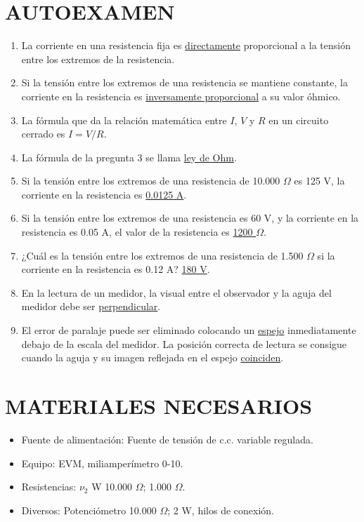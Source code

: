 \documentclass[12pt]{article}
\begin{document}
\section{AUTOEXAMEN}
\begin{enumerate}
    \item La corriente en una resistencia fija es \underline{directamente} proporcional a la tensión entre los extremos de la resistencia.
    \item Si la tensión entre los extremos de una resistencia se mantiene constante, la corriente en la resistencia es \underline{inversamente proporcional} a su valor óhmico.
    \item La fórmula que da la relación matemática entre \( I \), \( V \) y \( R \) en un circuito cerrado es \underline{\( I = V/R \)}.
    \item La fórmula de la pregunta 3 se llama \underline{ley de Ohm}.
    \item Si la tensión entre los extremos de una resistencia de 10.000 \( \Omega \) es 125 V, la corriente en la resistencia es \underline{0.0125 A}.
    \item Si la tensión entre los extremos de una resistencia es 60 V, y la corriente en la resistencia es 0.05 A, el valor de la resistencia es \underline{1200 \( \Omega \)}.
    \item ¿Cuál es la tensión entre los extremos de una resistencia de 1.500 \( \Omega \) si la corriente en la resistencia es 0.12 A? \underline{180 V}.
    \item En la lectura de un medidor, la visual entre el observador y la aguja del medidor debe ser \underline{perpendicular}.
    \item El error de paralaje puede ser eliminado colocando un \underline{espejo} inmediatamente debajo de la escala del medidor. La posición correcta de lectura se consigue cuando la aguja y su imagen reflejada en el espejo \underline{coinciden}.
\end{enumerate}

\section{MATERIALES NECESARIOS}
\begin{itemize}
    \item Fuente de alimentación: Fuente de tensión de c.c. variable regulada.
    \item Equipo: EVM, miliamperímetro 0-10.
    \item Resistencias: \( \nu_2 \) W 10.000 \( \Omega \); 1.000 \( \Omega \).
    \item Diversos: Potenciómetro 10.000 \( \Omega \); 2 W, hilos de conexión.
\end{itemize}
\end{document}
